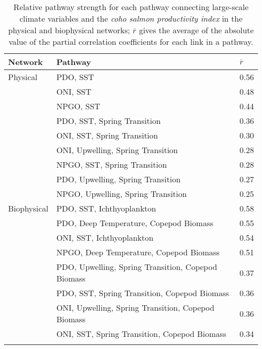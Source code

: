 {\small
\begin{longtable}{lll}
\caption[Relative pathway strength for each pathway connecting
         large-scale climate variables and the coho salmon productivity
         index.]{Relative pathway strength for each pathway connecting
         large-scale climate variables and the \emph{coho salmon productivity
         index} in the physical and biophysical networks; $\overline{r}$ gives
         the average of the absolute value of the partial correlation
         coefficients for each link in a pathway.} \\ 
  \hline
Network & Pathway & $\overline{r}$ \\ 
  \hline
Physical & PDO, SST  & 0.56 \\ 
   & ONI, SST  & 0.48 \\ 
   & NPGO, SST  & 0.44 \\ 
   & PDO, SST, Spring Transition  & 0.36 \\ 
   & ONI, SST, Spring Transition  & 0.30 \\ 
   & ONI, Upwelling, Spring Transition  & 0.28 \\ 
   & NPGO, SST, Spring Transition  & 0.28 \\ 
   & PDO, Upwelling, Spring Transition  & 0.27 \\ 
   & NPGO, Upwelling, Spring Transition  & 0.25 \\ 
  Biophysical & PDO, SST, Ichthyoplankton  & 0.58 \\ 
   & PDO, Deep Temperature, Copepod Biomass  & 0.55 \\ 
   & ONI, SST, Ichthyoplankton  & 0.54 \\ 
   & NPGO, Deep Temperature, Copepod Biomass  & 0.51 \\ 
   & PDO, Upwelling, Spring Transition, Copepod Biomass  & 0.37 \\ 
   & PDO, SST, Spring Transition, Copepod Biomass  & 0.36 \\ 
   & ONI, Upwelling, Spring Transition, Copepod Biomass  & 0.36 \\ 
   & ONI, SST, Spring Transition, Copepod Biomass  & 0.34 \\ 
  \hline
\label{tab:bn:s1}
\end{longtable}
}
